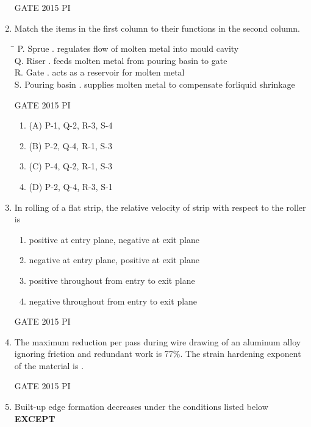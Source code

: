\documentclass[journal,12pt,onecolumn]{IEEEtran}
\theoremstyle{remark}
\begin{document}
\begin{enumerate}
\hfill{GATE 2015 PI}

\item Match the items in the first column to their functions in the second column.

\begin{tabbing}
\hspace{2cm} \= \kill
P. Sprue         . regulates flow of molten metal into mould cavity \\
Q. Riser         . feeds molten metal from pouring basin to gate \\
R. Gate          . acts as a reservoir for molten metal \\
S. Pouring basin   . supplies molten metal to compensate
forliquid shrinkage   \\
\end{tabbing}

\hfill{GATE 2015 PI}

\begin{enumerate}
    \item (A) P-1, Q-2, R-3, S-4
    \item (B) P-2, Q-4, R-1, S-3
    \item (C) P-4, Q-2, R-1, S-3
    \item (D) P-2, Q-4, R-3, S-1
\end{enumerate}
\item In rolling of a flat strip, the relative velocity of strip with respect to the roller is

\begin{enumerate}
    \item positive at entry plane, negative at exit plane
    \item negative at entry plane, positive at exit plane
    \item positive throughout from entry to exit plane
    \item negative throughout from entry to exit plane
\end{enumerate}

\hfill{GATE 2015 PI}



\item The maximum reduction per pass during wire drawing of an aluminum alloy ignoring friction and redundant work is 77\%. The strain hardening exponent of the material is \underline{\hspace{3cm}}.

\hfill{GATE 2015 PI}

\item Built-up edge formation decreases under the conditions listed below \textbf{EXCEPT}


\end{enumerate}
\end{document}
